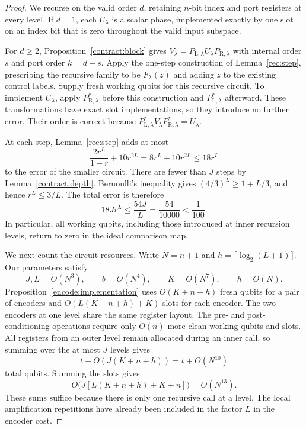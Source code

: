 \begin{proof}
We recurse on the valid order $d$, retaining $n$-bit index and port registers
at every level.  If $d=1$, each $U_\lambda$ is a scalar phase, implemented
exactly by one slot on an index bit that is zero throughout the valid input
subspace.

For $d\geq2$, Proposition~\ref{contract:block} gives
$V_\lambda=P_{\mathrm L,\lambda}U_\lambda P_{\mathrm R,\lambda}$ with
internal order $s$ and port order $k=d-s$.  Apply the one-step construction
of Lemma~\ref{rec:step}, prescribing the recursive family to be
$F_\lambda(z)$ and adding $z$ to the existing control labels.  Supply fresh
working qubits for this recursive circuit.  To implement $U_\lambda$, apply
$P_{\mathrm R,\lambda}^*$ before this construction and
$P_{\mathrm L,\lambda}^*$ afterward.  These transformations have exact slot
implementations, so they introduce no further error.  Their order is correct
because $P_{\mathrm L,\lambda}^*V_\lambda P_{\mathrm R,\lambda}^*=U_\lambda$.

At each step, Lemma~\ref{rec:step} adds at most
\[
 \frac{2r^L}{1-r}+10r^{2L}
 =8r^L+10r^{2L}\leq18r^L
\]
to the error of the smaller circuit.  There are fewer than $J$ steps by
Lemma~\ref{contract:depth}.  Bernoulli's inequality gives
$(4/3)^L\geq1+L/3$, and hence $r^L\leq3/L$.  The total error is therefore
\begin{equation}\label{rec:total-error}
 18Jr^L\leq\frac{54J}{L}=\frac{54}{10000}<\frac1{100}.
\end{equation}
In particular, all working qubits, including those introduced at inner
recursion levels, return to zero in the ideal comparison map.

We next count the circuit resources.  Write $N=n+1$ and
$h=\lceil\log_2(L+1)\rceil$.  Our parameters satisfy
\[
 J,L=O(N^3),\qquad b=O(N^4),\qquad K=O(N^7),\qquad h=O(N).
\]
Proposition~\ref{encode:implementation} uses $O(K+n+h)$ fresh qubits for a
pair of encoders and $O(L(K+n+h)+K)$ slots for each encoder.  The two encoders
at one level share the same register layout.  The pre- and post-conditioning
operations require only $O(n)$ more clean working qubits and slots.
All registers from an outer level remain allocated during an inner call,
so summing over the at most $J$ levels gives
\[
 t+O(J(K+n+h))=t+O(N^{10})
\]
total qubits.  Summing the slots gives
\[
 O\bigl(J[L(K+n+h)+K+n]\bigr)=O(N^{13}).
\]
These sums suffice because there is only one recursive call at a level.
The local amplification repetitions have already been included in the
factor $L$ in the encoder cost.


\end{proof}
